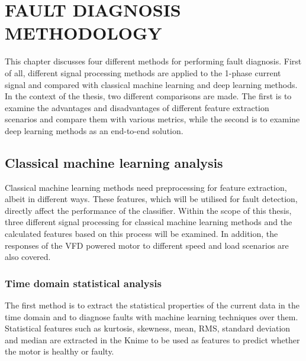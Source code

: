 \chapter{FAULT DIAGNOSIS METHODOLOGY}\label{Ch4}
This chapter discusses four different methods for performing fault diagnosis. First of all, different signal processing methods are applied to the 1-phase current signal and compared with classical machine learning and deep learning methods. In the context of the thesis, two different comparisons are made. The first is to examine the advantages and disadvantages of different feature extraction scenarios and compare them with various metrics, while the second is to examine deep learning methods as an end-to-end solution.
\section{Classical machine learning analysis}
Classical machine learning methods need preprocessing for feature extraction, albeit in different ways. These features, which will be utilised for fault detection, directly affect the performance of the classifier. Within the scope of this thesis, three different signal processing for classical machine learning methods and the calculated features based on this process will be examined. In addition, the responses of the VFD powered motor to different speed and load scenarios are also covered.
\subsection{Time domain statistical analysis}
The first method is to extract the statistical properties of the current data in the time domain and to diagnose faults with machine learning techniques over them. Statistical features such as kurtosis, skewness, mean, RMS, standard deviation and median are extracted in the Knime to be used as features to predict whether the motor is healthy or faulty. 

